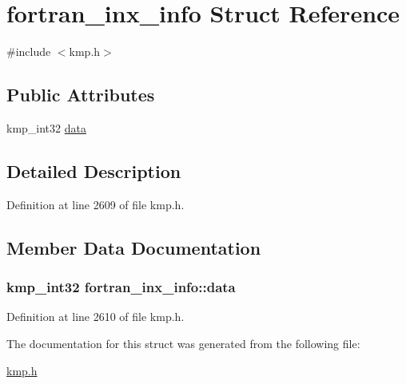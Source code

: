 \hypertarget{structfortran__inx__info}{\section{fortran\-\_\-inx\-\_\-info Struct Reference}
\label{structfortran__inx__info}
}


{\ttfamily \#include $<$kmp.\-h$>$}

\subsection*{Public Attributes}
\begin{DoxyCompactItemize}
\item 
kmp\-\_\-int32 \hyperlink{structfortran__inx__info_a91f68487ee59f2c74bab138ea72a8154}{data}
\end{DoxyCompactItemize}


\subsection{Detailed Description}


Definition at line 2609 of file kmp.\-h.



\subsection{Member Data Documentation}
\hypertarget{structfortran__inx__info_a91f68487ee59f2c74bab138ea72a8154}{
\subsubsection[{data}]{\setlength{\rightskip}{0pt plus 5cm}kmp\-\_\-int32 fortran\-\_\-inx\-\_\-info\-::data}}\label{structfortran__inx__info_a91f68487ee59f2c74bab138ea72a8154}


Definition at line 2610 of file kmp.\-h.



The documentation for this struct was generated from the following file\-:\begin{DoxyCompactItemize}
\item 
\hyperlink{kmp_8h}{kmp.\-h}\end{DoxyCompactItemize}
